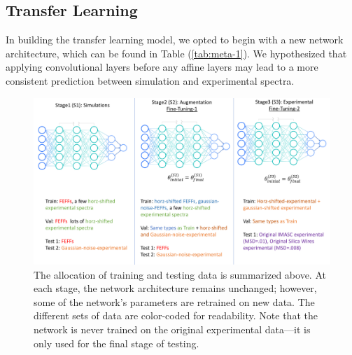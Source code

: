 \subsection{Transfer Learning}
In building the transfer learning model, we opted to begin with a new network architecture, which can be found in Table (\ref{tab:meta-1}). We hypothesized that applying convolutional layers before any affine layers may lead to a more consistent prediction between simulation and experimental spectra.

\begin{figure}
    \centering
    \includegraphics[width=\linewidth]{Chapters/Figures/transfer-learning-breakdown.pdf}
    \caption[Transfer Learning Process]{The allocation of training and testing data is summarized above. At each stage, the network architecture remains unchanged; however, some of the network's parameters are retrained on new data. The different sets of data are color-coded for readability. Note that the network is never trained on the original experimental data---it is only used for the final stage of testing.}
    \label{fig:transfer-learning-databreakdown}
\end{figure}

